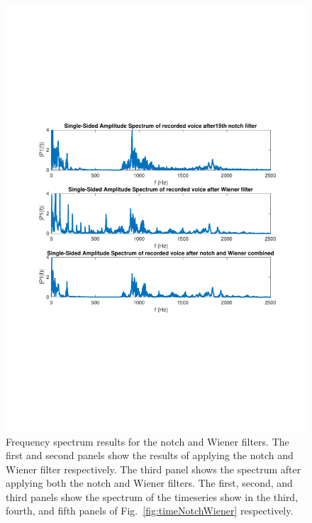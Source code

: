 \documentclass[paper-main.tex]{subfiles}
\begin{document}
\begin{figure}
\begin{center}
\includegraphics[width=\textwidth,trim={0cm 8.2cm 0cm 8cm},clip]{figures/freqNotchWiener.pdf}
\end{center}
\caption{\label{fig:freqNotchWiener}
Frequency spectrum results for the notch and Wiener filters. 
The first and second panels show the results of applying the notch and Wiener filter respectively.
The third panel shows the spectrum after applying both the notch and Wiener filters. 
The first, second, and third panels show the spectrum of the timeseries show in the third, fourth, and fifth panels of Fig.~\ref{fig:timeNotchWiener} respectively. 
}
\end{figure}

\end{document}

